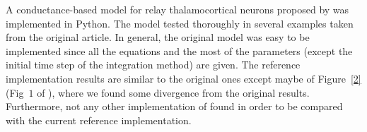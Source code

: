 \documentclass[10pt,a4paper,onecolumn]{article}
\begin{document}
A conductance-based model for relay thalamocortical neurons proposed 
by \cite{wang:1994} was implemented in Python. The model tested 
thoroughly in several examples taken from the original article. 
In general, the original model was easy to be implemented since all the
equations and the most of the parameters (except the initial time step of the
integration method) are given. The reference implementation results are similar
to the original ones except maybe of Figure~\ref{2} (Fig~$1$ of
\cite{wang:1994}), where we found some divergence from the original results.
Furthermore, not any other implementation of \cite{wang:1994} found in order
to be compared with the current reference implementation. 

{\sffamily \small
  \printbibliography[title=References]
}
\end{document}
